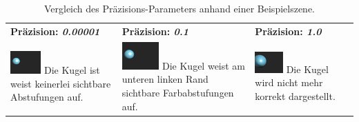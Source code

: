 \begin{table}[H]\label{table:sphere_tracing_precision}
    \centering
    \caption{Vergleich des Präzisions-Parameters anhand einer Beispielszene.}
    \begin{tabular}{p{}p{}p{}}
        \toprule
            \textbf{Präzision: \textit{0.00001}} &
            \textbf{Präzision: \textit{0.1}}     &
            \textbf{Präzision: \textit{1.0}}     \\
        \cmidrule(r){1-1}\cmidrule(lr){2-2}\cmidrule(l){3-3}
            \includegraphics[width=0.3\textwidth]{img/sphere_tracing_precision_full.png} \newline
            Die Kugel ist weist keinerlei sichtbare Abstufungen auf. &
            \includegraphics[width=0.3\textwidth]{img/sphere_tracing_precision_min.png} \newline
            Die Kugel weist am unteren linken Rand sichtbare Farbabstufungen auf. &
            \includegraphics[width=0.3\textwidth]{img/sphere_tracing_precision_pos.png} \newline
            Die Kugel wird nicht mehr korrekt dargestellt. \\
        \bottomrule
    \end{tabular}
\end{table}

